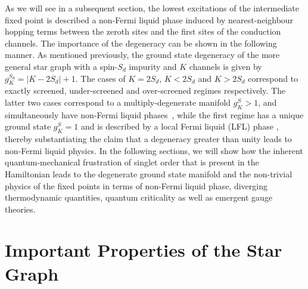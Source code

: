\documentclass[reprint,prb,superscriptaddress]{revtex4-2}
\begin{document}
As we will see in a subsequent section, the lowest excitations of the intermediate fixed point is described a non-Fermi liquid phase induced by nearest-neighbour hopping terms between the zeroth sites and the first sites of the conduction channels. The importance of the degeneracy can be shown in the following manner. As mentioned previously, the ground state degeneracy of the more general star graph with a spin-\({S_d}\) impurity and \(K\) channels is given by \(g^{S_d}_K = |K - 2{S_d}|+1\). The cases of \(K=2{S_d}\), \(K<2{S_d}\) and \(K>2{S_d}\) correspond to exactly screened, under-screened and over-screened regimes respectively. {The latter two cases correspond to a multiply-degenerate manifold \(g^S_K > 1\), and simultaneously have non-Fermi liquid phases~\cite{Noz_blandin_1980,Gan_Andrei_Coleman_1993,emery_kivelson,Gan_mchannel_1994,Tsvelick_Weigmann_mchannel_1984,Tsvelick_weigmann_mchannel_1985,parcollet_olivier_large_N,kimura_taro_Su_N_kondo,PhysRevB.73.224445,cox_jarrell_two_channel_rev,affleck_1991_overscreen,Coleman_tsvelik,affleck1993exact,coleman_pepin_2003,roch_nicolas_costi_2009,schiller_avraham_2008,Durganandini_2011}, while the first regime has a unique ground state \(g^S_K = 1\) and is described by a local Fermi liquid (LFL) phase \cite{wilson1975,nozieres1974fermi,Noz_blandin_1980,andreiKondoreview,tsvelickKondoreview}, thereby substantiating the claim that a degeneracy greater than unity leads to non-Fermi liquid physics.} In the following sections, we will show how the inherent quantum-mechanical frustration of singlet order that is present in the Hamiltonian leads to the degenerate ground state manifold and the non-trivial physics of the fixed points in terms of non-Fermi liquid phase, diverging thermodynamic quantities, quantum criticality as well as emergent gauge theories.
\section{Important Properties of the Star Graph}
\end{document}

